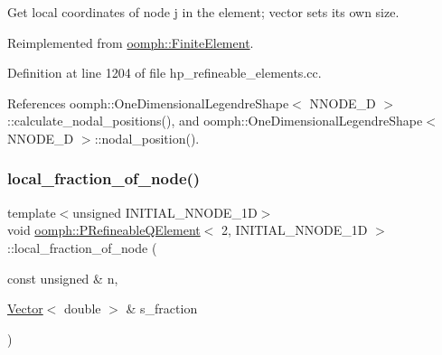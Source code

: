 Get local coordinates of node j in the element; vector sets its own size. 



Reimplemented from \hyperlink{classoomph_1_1FiniteElement_a22bc4ee35e4f948d8d7fba18c7b4f4c4}{oomph\+::\+Finite\+Element}.



Definition at line 1204 of file hp\+\_\+refineable\+\_\+elements.\+cc.



References oomph\+::\+One\+Dimensional\+Legendre\+Shape$<$ N\+N\+O\+D\+E\+\_\+D $>$\+::calculate\+\_\+nodal\+\_\+positions(), and oomph\+::\+One\+Dimensional\+Legendre\+Shape$<$ N\+N\+O\+D\+E\+\_\+D $>$\+::nodal\+\_\+position().

\mbox{\label{classoomph_1_1PRefineableQElement_3_012_00_01INITIAL__NNODE__1D_01_4_a2ba8be38964ccde650ff649a78a49a34}} 
\subsubsection{\texorpdfstring{local\+\_\+fraction\+\_\+of\+\_\+node()}{local\_fraction\_of\_node()}}
{\footnotesize\ttfamily template$<$unsigned I\+N\+I\+T\+I\+A\+L\+\_\+\+N\+N\+O\+D\+E\+\_\+1D$>$ \\
void \hyperlink{classoomph_1_1PRefineableQElement}{oomph\+::\+P\+Refineable\+Q\+Element}$<$ 2, I\+N\+I\+T\+I\+A\+L\+\_\+\+N\+N\+O\+D\+E\+\_\+1D $>$\+::local\+\_\+fraction\+\_\+of\+\_\+node (\begin{DoxyParamCaption}\item[{const unsigned \&}]{n,  }\item[{\hyperlink{classoomph_1_1Vector}{Vector}$<$ double $>$ \&}]{s\+\_\+fraction }\end{DoxyParamCaption})\hspace{0.3cm}{\ttfamily [virtual]}}



